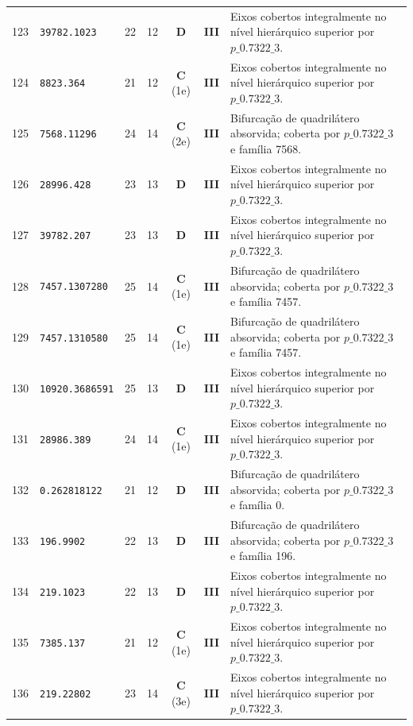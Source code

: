\documentclass[11pt,a4paper]{article}
\begin{document}
\begin{small}
\begin{longtable}{r l c c c c p{8.8cm}}
123 & \texttt{39782.1023} & 22 & 12 & \textbf{D} & \textbf{III} & Eixos cobertos integralmente no nível hierárquico superior por $p\_0.7322\_3$. \\
124 & \texttt{8823.364} & 21 & 12 & \textbf{C} (1e) & \textbf{III} & Eixos cobertos integralmente no nível hierárquico superior por $p\_0.7322\_3$. \\
125 & \texttt{7568.11296} & 24 & 14 & \textbf{C} (2e) & \textbf{III} & Bifurcação de quadrilátero absorvida; coberta por $p\_0.7322\_3$ e família 7568. \\
126 & \texttt{28996.428} & 23 & 13 & \textbf{D} & \textbf{III} & Eixos cobertos integralmente no nível hierárquico superior por $p\_0.7322\_3$. \\
127 & \texttt{39782.207} & 23 & 13 & \textbf{D} & \textbf{III} & Eixos cobertos integralmente no nível hierárquico superior por $p\_0.7322\_3$. \\
128 & \texttt{7457.1307280} & 25 & 14 & \textbf{C} (1e) & \textbf{III} & Bifurcação de quadrilátero absorvida; coberta por $p\_0.7322\_3$ e família 7457. \\
129 & \texttt{7457.1310580} & 25 & 14 & \textbf{C} (1e) & \textbf{III} & Bifurcação de quadrilátero absorvida; coberta por $p\_0.7322\_3$ e família 7457. \\
130 & \texttt{10920.3686591} & 25 & 13 & \textbf{D} & \textbf{III} & Eixos cobertos integralmente no nível hierárquico superior por $p\_0.7322\_3$. \\
131 & \texttt{28986.389} & 24 & 14 & \textbf{C} (1e) & \textbf{III} & Eixos cobertos integralmente no nível hierárquico superior por $p\_0.7322\_3$. \\
132 & \texttt{0.262818122} & 21 & 12 & \textbf{D} & \textbf{III} & Bifurcação de quadrilátero absorvida; coberta por $p\_0.7322\_3$ e família 0. \\
133 & \texttt{196.9902} & 22 & 13 & \textbf{D} & \textbf{III} & Bifurcação de quadrilátero absorvida; coberta por $p\_0.7322\_3$ e família 196. \\
134 & \texttt{219.1023} & 22 & 13 & \textbf{D} & \textbf{III} & Eixos cobertos integralmente no nível hierárquico superior por $p\_0.7322\_3$. \\
135 & \texttt{7385.137} & 21 & 12 & \textbf{C} (1e) & \textbf{III} & Eixos cobertos integralmente no nível hierárquico superior por $p\_0.7322\_3$. \\
136 & \texttt{219.22802} & 23 & 14 & \textbf{C} (3e) & \textbf{III} & Eixos cobertos integralmente no nível hierárquico superior por $p\_0.7322\_3$. \\

\end{longtable}
\end{small}
\end{document}
